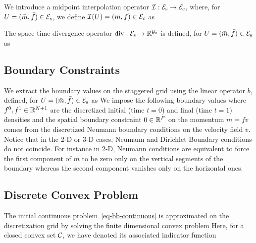 We introduce a midpoint interpolation operator $\mathcal{I} : \mathcal{E}_{\text{s}} \rightarrow \mathcal{E}_{\text{c}}$,  where, for $U = (\bar m,\bar f) \in \mathcal{E}_{\text{s}}$, we define  $\mathcal{I}(U) = (m,f) \in \mathcal{E}_{\text{c}}$  as


The space-time divergence operator $\operatorname{div} : \mathcal{E}_{\text{s}} \rightarrow \mathbb{R}^{\mathcal{G}_{\text{c}}}$ is defined, for $U = (\bar m,\bar f) \in \mathcal{E}_{\text{s}}$ as

\subsection{Boundary Constraints}

We extract the boundary values on the staggered grid using the linear operator $b$, defined, for $U = (\bar m,\bar f) \in \mathcal{E}_{\text{s}}$ as
We impose the following boundary values 
where $f^0,f^1 \in \mathbb{R}^{N+1}$ are the discretized initial (time $t=0$) and final (time $t=1$) densities and the spatial boundary constraint $0\in  \mathbb{R}^{P}$ on the momentum $m=fv$ comes from the discretized  Neumann boundary conditions on the velocity field $v$.  Notice that in the 2-D or 3-D  cases, Neumann and Dirichlet Boundary conditions do not coincide. For instance in 2-D, Neumann conditions are equivalent to force the first component of $\bar m$ to be zero only on the vertical segments of the boundary whereas the second component vanishes only on the horizontal ones.   


\subsection{Discrete Convex Problem}

The initial continuous problem~\eqref{eq-bb-continuous} is approximated on the discretization grid by solving the finite dimensional convex problem
Here, for a closed convex set $\mathcal{C}$, we have denoted its associated indicator function

